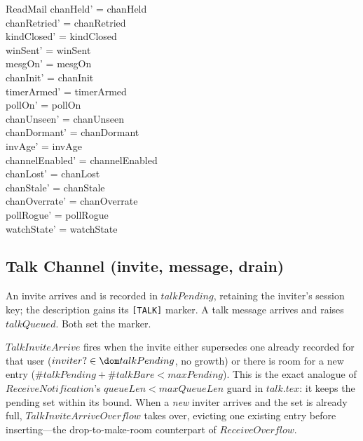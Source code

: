 \documentclass[a4paper,10pt,fleqn]{article}
\begin{document}
\begin{schema}{ReadMail}
  chanHeld' = chanHeld \\
  chanRetried' = chanRetried \\
  kindClosed' = kindClosed \\
  winSent' = winSent \\
  mesgOn' = mesgOn \\
  chanInit' = chanInit \\
  timerArmed' = timerArmed \\
  pollOn' = pollOn \\
  chanUnseen' = chanUnseen \\
  chanDormant' = chanDormant \\
  invAge' = invAge \\
  channelEnabled' = channelEnabled \\
  chanLost' = chanLost \\
  chanStale' = chanStale \\
  chanOverrate' = chanOverrate \\
  pollRogue' = pollRogue \\
  watchState' = watchState
\end{schema}

\subsection{Talk Channel (invite, message, drain)}

An invite arrives and is recorded in $talkPending$, retaining the
inviter's session key; the description gains its \texttt{[TALK]} marker.
A talk message arrives and raises $talkQueued$.  Both set the marker.

$TalkInviteArrive$ fires when the invite either supersedes one already
recorded for that user ($inviter? \in \dom talkPending$, no growth) or
there is room for a new entry ($\# talkPending + \# talkBare <
maxPending$).  This is the exact analogue of $ReceiveNotification$'s
$queueLen < maxQueueLen$ guard in $talk.tex$: it keeps the pending set
within its bound.  When a \emph{new} inviter arrives and the set is
already full, $TalkInviteArriveOverflow$ takes over, evicting one
existing entry before inserting---the drop-to-make-room counterpart of
$ReceiveOverflow$.
\end{document}
